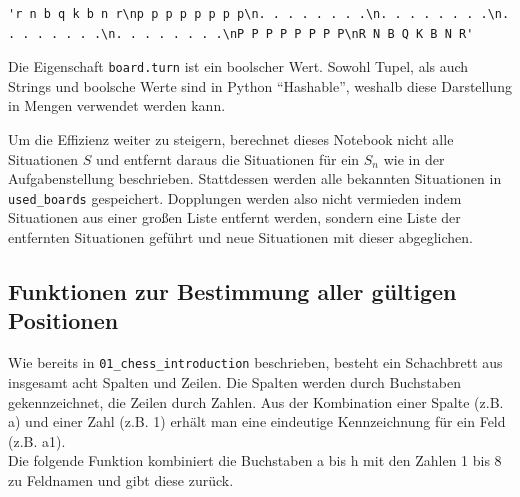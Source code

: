 \documentclass[a4paper,12pt]{article}
\begin{document}
\begin{verbatim}
'r n b q k b n r\np p p p p p p p\n. . . . . . . .\n. . . . . . . .\n. . . . . . . .\n. . . . . . . .\nP P P P P P P P\nR N B Q K B N R'
\end{verbatim}

Die Eigenschaft \texttt{board.turn} ist ein boolscher Wert. Sowohl
Tupel, als auch Strings und boolsche Werte sind in Python ``Hashable'',
weshalb diese Darstellung in Mengen verwendet werden kann.

Um die Effizienz weiter zu steigern, berechnet dieses Notebook nicht
alle Situationen \(S\) und entfernt daraus die Situationen für ein
\(S_n\) wie in der Aufgabenstellung beschrieben. Stattdessen werden alle
bekannten Situationen in \texttt{used\_boards} gespeichert. Dopplungen
werden also nicht vermieden indem Situationen aus einer großen Liste
entfernt werden, sondern eine Liste der entfernten Situationen geführt
und neue Situationen mit dieser abgeglichen.

    \hypertarget{funktionen-zur-bestimmung-aller-guxfcltigen-positionen}{%
\subsection{Funktionen zur Bestimmung aller gültigen
Positionen}\label{funktionen-zur-bestimmung-aller-guxfcltigen-positionen}}

Wie bereits in \texttt{01\_chess\_introduction} beschrieben, besteht ein
Schachbrett aus insgesamt acht Spalten und Zeilen. Die Spalten werden
durch Buchstaben gekennzeichnet, die Zeilen durch Zahlen. Aus der
Kombination einer Spalte (z.B. a) und einer Zahl (z.B. 1) erhält man
eine eindeutige Kennzeichnung für ein Feld (z.B. a1).\\
Die folgende Funktion kombiniert die Buchstaben a bis h mit den Zahlen 1
bis 8 zu Feldnamen und gibt diese zurück.
\end{document}

